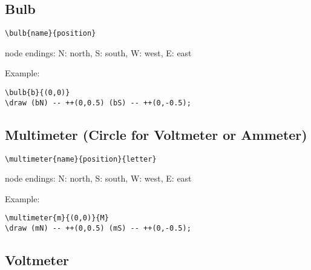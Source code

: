 \documentclass[parskip=full]{scrartcl}
\begin{document}
\subsection{Bulb}

\begin{verbatim}
\bulb{name}{position}
\end{verbatim}
node endings: N: north, S: south, W: west, E: east

Example:\\
\begin{minipage}{0.8\textwidth}
\begin{verbatim}
\bulb{b}{(0,0)}
\draw (bN) -- ++(0,0.5) (bS) -- ++(0,-0.5);
\end{verbatim}
\end{minipage}
\begin{minipage}{0.19\textwidth}
\end{minipage}

\subsection{Multimeter (Circle for Voltmeter or Ammeter)}

\begin{verbatim}
\multimeter{name}{position}{letter}
\end{verbatim}
node endings: N: north, S: south, W: west, E: east

Example:\\
\begin{minipage}{0.8\textwidth}
\begin{verbatim}
\multimeter{m}{(0,0)}{M}
\draw (mN) -- ++(0,0.5) (mS) -- ++(0,-0.5);
\end{verbatim}
\end{minipage}
\begin{minipage}{0.19\textwidth}
\end{minipage}

\subsection{Voltmeter}
\end{document}
